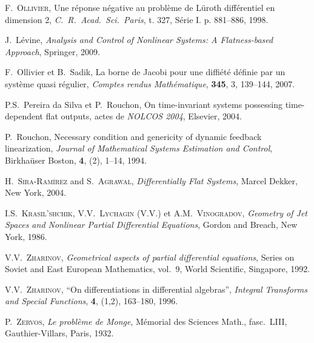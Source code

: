 \documentclass[A4paper, 12pt]{article}
\def\textem#1{{\em #1\/}}
\begin{document}
\begin{thebibliography}{00}
 F.~\textsc{Ollivier}, {\og}Une réponse
négative au problème de Lüroth différentiel en dimension 2{\fg},
\textit{C.\ R.\ Acad.\ Sci.\ Paris}, t. 327, Série I. p. 881--886, 1998.

 J.~Lévine, \textit{Analysis and Control of Nonlinear
  Systems: A Flatness-based Approach}, Springer, 2009. 

 F.~Ollivier et
B.~Sadik, {\og}La borne de Jacobi pour une
diffiété définie par un système quasi régulier{\fg},
\textem{Comptes rendus Mathématique}, {\bf 345}, 3, 139--144,
2007.

 P.S.~Pereira da Silva
  et P.~Rouchon, \og On time-invariant systems
  possessing time-dependent flat outputs\fg, actes de \textit{NOLCOS
  2004}, Elsevier, 2004.


  P.~Rouchon, {\og}Necessary
  condition and genericity of dynamic feedback linearization{\fg},
  \textit{Journal of Mathematical Systems Estimation and Control},
  Birkhaüser Boston, \textbf{4}, (2), 1--14, 1994.

 H.~\textsc{Sira-Ramírez} and S.~\textsc{Agrawal},
  \textit{Differentially Flat Systems}, Marcel Dekker, New York, 2004.

I.S.~\textsc{Krasil'shchik}, V.V.~\textsc{Lychagin} (V.V.) et
A.M.~\textsc{Vinogradov},
 \textit{Geometry of Jet Spaces and Nonlinear Partial Differential
Equations}, Gordon and Breach, New York, 1986.

 V.V.~\textsc{Zharinov},
\textit{Geometrical aspects of partial differential equations},
Series on Soviet and East European Mathematics, vol.~9, World
Scientific, Singapore, 1992.

 V.V.~\textsc{Zharinov}, ``On differentiations in
  differential algebras'', \textit{Integral Transforms and Special
    Functions}, \textbf{4}, (1,2), 163--180, 1996.

 P.~\textsc{Zervos}, \textem{Le problème
  de Monge},  Mémorial des Sciences Math., fasc.~LIII,
  Gauthier-Villars, Paris, 1932.

\end{thebibliography}
\end{document}
